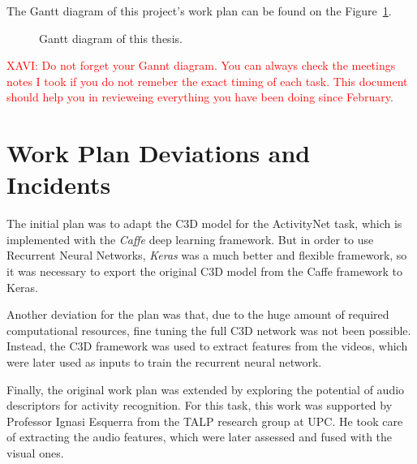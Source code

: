The Gantt diagram of this project's work plan can be found on the Figure~\ref{fig:gantt_diagram}.

\begin{figure}[H]
\begin{center}
\end{center}
\caption{Gantt diagram of this thesis.}
\label{fig:gantt_diagram}
\end{figure}

\textcolor{red}{XAVI: Do not forget your Gannt diagram. You can always check the meetings notes I took if you do not remeber the exact timing of each task. This document should help you in revieweing everything you have been doing since February.}


\section{Work Plan Deviations and Incidents}
\label{section:work_plan_deviations}

The initial plan was to adapt the C3D\cite{tran2014learning} model for the ActivityNet task, which is implemented with the  \textit{Caffe} deep learning framework. But in order to use Recurrent Neural Networks, \textit{Keras} was a much better and flexible framework, so it was necessary to export the original C3D model from the Caffe framework to Keras.

Another deviation for the plan was that, due to the huge amount of required computational resources, fine tuning the full C3D network was not been possible. Instead, the C3D framework was used to extract features from the videos, which were later used as inputs to train the recurrent neural network.

Finally, the original work plan was extended by exploring the potential of audio descriptors for activity recognition. For this task, this work was supported by Professor Ignasi Esquerra from the TALP research group at UPC. He took care of extracting the audio features, which were later assessed and fused with the visual ones.
